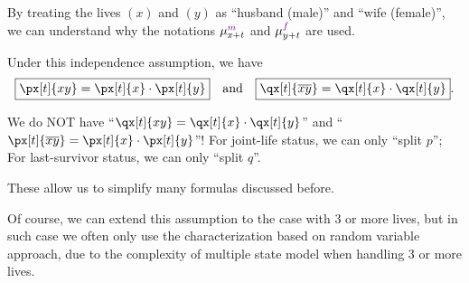 \begin{enumerate}
\begin{note}
By treating the lives \((x)\) and \((y)\) as ``husband (male)'' and ``wife
(female)'', we can understand why the notations \(\mu_{x+t}^{{\color{violet}m}}\) and
\(\mu_{y+t}^{{\color{violet}f}}\) are used.
\end{note}
\begin{center}
\end{center}
Under this independence assumption, we have
\[
\boxed{\px[t]{xy}=\px[t]{x}\cdot \px[t]{y}}
\qqtext{and}
\boxed{\qx[t]{\overline{xy}}=\qx[t]{x}\cdot \qx[t]{y}}.
\]
\begin{warning}
We do NOT have ``\(\qx[t]{xy}=\qx[t]{x}\cdot \qx[t]{y}\)'' and
``\(\px[t]{\overline{xy}}=\px[t]{x}\cdot \px[t]{y}\)''! For joint-life status,
we can only ``split \(p\)''; For last-survivor status, we can only ``split
\(q\)''.
\end{warning}

These allow us to simplify many formulas discussed before.

Of course, we can extend this assumption to the case with 3 or more lives, but
in such case we often only use the characterization based on random variable
approach, due to the complexity of multiple state model when handling 3 or more
lives.
\end{enumerate}
